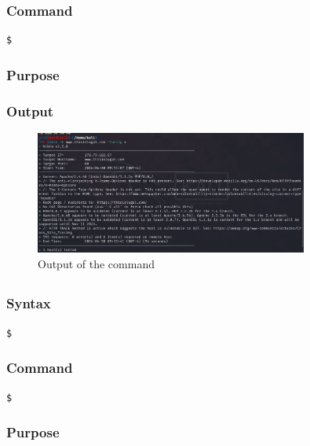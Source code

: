 \documentclass[11pt]{article}
\begin{document}
\subsubsection*{Command}
\begin{verbatim}
$
\end{verbatim}

\subsubsection*{Purpose}

\subsubsection*{Output}
\begin{figure}[H]
    \centering
    \includegraphics[width=0.8\textwidth]{assignment 8 (4).png}
    \caption{Output of the command}
    \label{fig:1}
\end{figure}

\subsection{}

\subsubsection*{Syntax}
\begin{verbatim}
$
\end{verbatim}

\subsubsection*{Command}
\begin{verbatim}
$
\end{verbatim}

\subsubsection*{Purpose}
\end{document}
